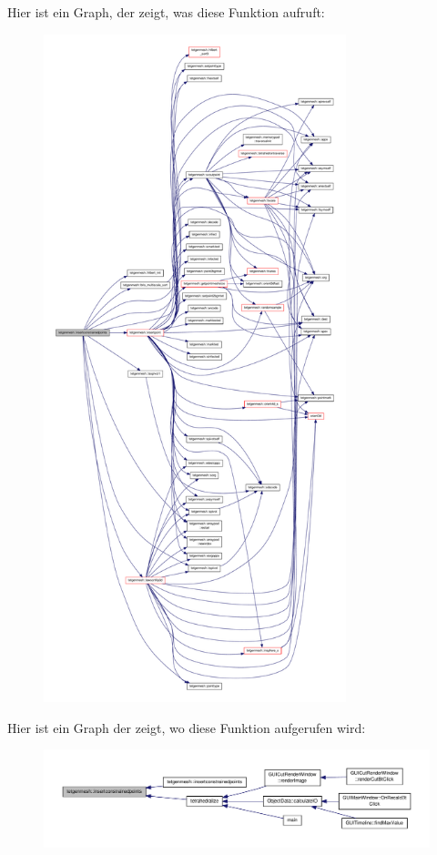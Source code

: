 Hier ist ein Graph, der zeigt, was diese Funktion aufruft\-:
\nopagebreak
\begin{figure}[H]
\begin{center}
\leavevmode
\includegraphics[height=550pt]{classtetgenmesh_ac8205cae8e16f490b80d74975934ff74_cgraph}
\end{center}
\end{figure}




Hier ist ein Graph der zeigt, wo diese Funktion aufgerufen wird\-:
\nopagebreak
\begin{figure}[H]
\begin{center}
\leavevmode
\includegraphics[width=350pt]{classtetgenmesh_ac8205cae8e16f490b80d74975934ff74_icgraph}
\end{center}
\end{figure}


